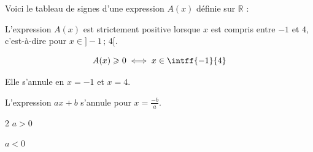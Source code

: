 \begin{ex}{}
	Voici le tableau de signes d'une expression $A(x)$ définie sur $\mathbb{R}$ :
	\begin{center}
	\end{center}

	L'expression $A(x)$ est strictement positive lorsque $x$ est compris entre $-1$ et $4$, c'est-à-dire pour $x \in ] - 1 \,;\, 4[$.

	\[
		A(x) \ge 0 \iff x \in \intff{-1}{4}
	\]

	Elle s'annule en $x = -1$ et $x = 4$.
\end{ex}

\begin{prop}
	L'expression $ax + b$ s'annule pour $x = \frac{-b}{a}$.

	\begin{center}
		\begin{multicols}{2}
			\centering
			{$a > 0$}
			\vskip 2mm

			\columnbreak

			\centering
			{$a < 0$}
			\vskip 2mm
		\end{multicols}
	\end{center}
\end{prop}

